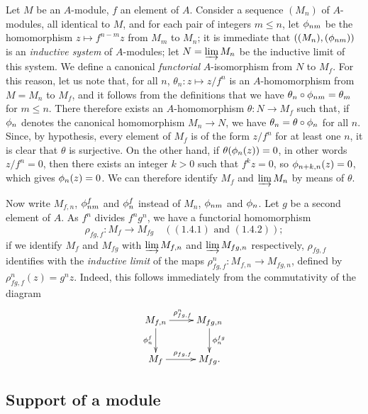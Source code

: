 \begin{env}[1.6.1]
\label{env-0.1.6.1}
Let $M$ be an $A$-module, $f$ an element of $A$. Consider a sequence $(M_n)$ of
$A$-modules, all identical to $M$, and for each pair of integers $m\leqslant n$,
let $\phi_{nm}$ be the homomorphism $z\mapsto f^{n-m}z$ from $M_m$ to $M_n$; it
is immediate that $((M_n),(\phi_{nm}))$ is an {\em inductive system} of
$A$-modules; let $N=\varinjlim M_n$ be the inductive limit of this system. We
define a canonical {\em functorial} $A$-isomorphism from $N$ to $M_f$. For this
reason, let us note that, for all $n$, $\theta_n:z\mapsto z/f^n$ is an
$A$-homomorphism from $M=M_n$ to $M_f$, and it follows from the definitions that
we have $\theta_n\circ\phi_{nm}=\theta_m$ for $m\leqslant n$. There therefore
exists an $A$-homomorphism $\theta:N\to M_f$ such that, if $\phi_n$ denotes the
canonical homomorphism $M_n\to N$, we have $\theta_n=\theta\circ\phi_n$ for all
$n$. Since, by hypothesis, every element of $M_f$ is of the form $z/f^n$ for at
least one $n$, it is clear that $\theta$ is surjective. On the other hand, if
$\theta(\phi_n(z))=0$, in other words $z/f^n=0$, then there exists an integer
$k>0$ such that $f^k z=0$, so $\phi_{n+k,n}(z)=0$, which gives $\phi_n(z)=0$.
We can therefore identify $M_f$ and $\varinjlim M_n$ by means of $\theta$.
\end{env}

\begin{env}[1.6.2]
\label{env-0.1.6.2}
Now write $M_{f,n}$, $\phi_{nm}^f$ and $\phi_n^f$ instead of $M_n$,
$\phi_{nm}$ and $\phi_n$. Let $g$ be a second element of $A$. As $f^n$ divides
$f^n g^n$, we have a functorial homomorphism
\[
  \rho_{fg,f}:M_f\longrightarrow M_{fg}
  \quad(\hyperref[env-0.1.4.1]{(1.4.1)}\text{ and }\hyperref[env-0.1.4.3]{(1.4.2)});
\]
if we identify $M_f$ and $M_{fg}$ with $\varinjlim M_{f,n}$ and
$\varinjlim M_{fg,n}$ respectively, $\rho_{fg,f}$ identifies with the
{\em inductive limit} of the maps $\rho_{fg,f}^n:M_{f,n}\to M_{fg,n}$, defined
by $\rho_{fg,f}^n(z)=g^n z$. Indeed, this follows immediately from the
commutativity of the diagram
\[
  \xymatrix{
    M_{f,n}\ar[r]^{\rho_{fg,f}^n}\ar[d]_{\vphi_n^f} &
    M_{fg,n}\ar[d]^{\vphi_n^{fg}}\\
    M_f\ar[r]^{\rho_{fg,f}} &
    M_{fg}.
  }
\]
\end{env}

\subsection{Support of a module}
\label{subsection-support-of-module}

